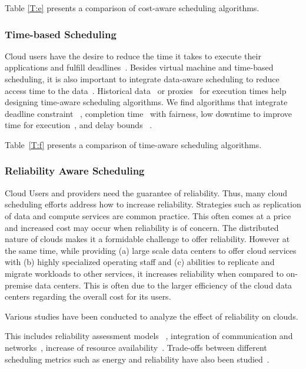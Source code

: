 \documentclass[final,5p,times,twocolumn]{elsarticle}
\begin{document}
Table \ref{T:e} presents a comparison of cost-aware scheduling algorithms.

%

\subsubsection{Time-based Scheduling}\label{sec:time}


Cloud users have the desire to reduce the time it takes to execute their applications and fulfill deadlines~\cite{arabnejad2017scheduling}. Besides virtual machine and time-based scheduling, it is also important to integrate data-aware scheduling to reduce access time to the data~\cite{vandenbosshe2013}. Historical data~\cite{thomas2015credit} or proxies~\cite{erdil2013autonomic} for execution times help designing time-aware scheduling algorithms. We find algorithms that integrate deadline constraint ~\cite{li2016energy}, completion time~\cite{xu2011job} with fairness, low downtime to improve time for execution~\cite{frincu2014scheduling}, and delay bounds ~\cite{yuan2017time}.

Table~\ref{T:f} presents a comparison of time-aware scheduling algorithms.

%

\subsubsection{Reliability Aware Scheduling}\label{sec:reliability}



Cloud Users and providers need the guarantee of reliability. Thus, many cloud scheduling efforts address how to increase reliability. Strategies such as replication of data and compute services are common practice. This often comes at a price and increased cost may occur when reliability is of concern. The distributed nature of clouds makes it a formidable challenge to offer reliability. However at the same time, while providing (a) large scale data centers to offer cloud services with (b) highly specialized operating staff and (c) abilities to replicate and migrate workloads to other services, it increases reliability when compared to on-premise data centers. This is often due to the larger efficiency of the cloud data centers regarding the overall cost for its users.

Various studies have been conducted to analyze the effect of reliability on clouds.

This includes reliability assessment models ~\cite{malik2012reliability}, integration of communication and networks~\cite{jing2015reliability}, increase of resource availability~\cite{latiff2016fault}. Trade-offs between different scheduling metrics such as energy and reliability have also been studied~\cite{tang2016energy}.
\end{document}
